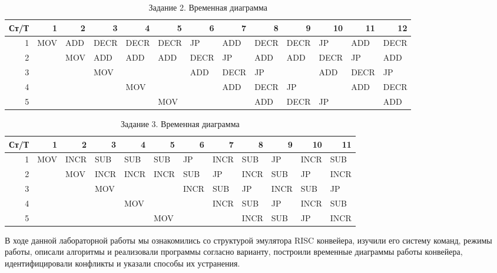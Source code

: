 \documentclass[a4paper,14pt]{extarticle}
\begin{document}
\begin{landscape}
\begin{table}[htbp]
	\begin{tabular}{|r|l|l|l|l|l|l|l|l|l|l|l|l|}
		\hline
		\multicolumn{1}{|l|}{Ст/Т} & \multicolumn{1}{r|}{1} & \multicolumn{1}{r|}{2} & \multicolumn{1}{r|}{3} & \multicolumn{1}{r|}{4} & \multicolumn{1}{r|}{5} & \multicolumn{1}{r|}{6} & \multicolumn{1}{r|}{7} & \multicolumn{1}{r|}{8} & \multicolumn{1}{r|}{9} & \multicolumn{1}{r|}{10} & \multicolumn{1}{r|}{11} & \multicolumn{1}{r|}{12} \\ \hline
		1 & MOV & ADD & DECR & DECR & DECR & JP & ADD & DECR & DECR & JP & ADD & DECR \\ \hline
		2 &  & MOV & ADD & ADD & ADD & DECR & JP & ADD & ADD & DECR & JP & ADD \\ \hline
		3 &  &  & MOV &  &  & ADD & DECR & JP &  & ADD & DECR & JP \\ \hline
		4 &  &  &  & MOV &  &  & ADD & DECR & JP &  & ADD & DECR \\ \hline
		5 &  &  &  &  & MOV &  &  & ADD & DECR & JP &  & ADD \\ \hline
	\end{tabular}
	\caption{Задание 2. Временная диаграмма}
	\label{tab:time-2}
\end{table}

\begin{table}[htbp]
	\begin{tabular}{|r|l|l|l|l|l|l|l|l|l|l|l|}
		\hline
		\multicolumn{1}{|l|}{Ст/Т} & \multicolumn{1}{r|}{1} & \multicolumn{1}{r|}{2} & \multicolumn{1}{r|}{3} & \multicolumn{1}{r|}{4} & \multicolumn{1}{r|}{5} & \multicolumn{1}{r|}{6} & \multicolumn{1}{r|}{7} & \multicolumn{1}{r|}{8} & \multicolumn{1}{r|}{9} & \multicolumn{1}{r|}{10} & \multicolumn{1}{r|}{11} \\ \hline
		1 & MOV & INCR & SUB & SUB & SUB & JP & INCR & SUB & JP & INCR & SUB \\ \hline
		2 &  & MOV & INCR & INCR & INCR & SUB & JP & INCR & SUB & JP & INCR \\ \hline
		3 &  &  & MOV &  &  & INCR & SUB & JP & INCR & SUB & JP \\ \hline
		4 &  &  &  & MOV &  &  & INCR & SUB & JP & INCR & SUB \\ \hline
		5 &  &  &  &  & MOV &  &  & INCR & SUB & JP & INCR \\ \hline
	\end{tabular}
	\caption{Задание 3. Временная диаграмма}
	\label{tab:time-3}
\end{table}

\end{landscape}



В ходе данной лабораторной работы мы ознакомились со структурой эмулятора RISC конвейера, изучили его систему команд, режимы работы, описали алгоритмы и реализовали программы согласно варианту, построили временные диаграммы работы конвейера, идентифицировали конфликты и указали способы их устранения.
\end{document}
